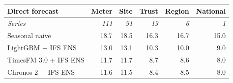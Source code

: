 \begin{tabular}{lrrrrr}
\toprule
Direct forecast & Meter & Site & Trust & Region & National \\
\midrule
\textit{Series} & \textit{111} & \textit{91} & \textit{19} & \textit{6} & \textit{1} \\
\addlinespace[3pt]
Seasonal naive & 18.7 & 18.5 & 16.3 & 16.7 & 15.0 \\
LightGBM + IFS ENS & 13.0 & 13.1 & 10.3 & 10.0 & 9.0 \\
TimesFM 3.0 + IFS ENS & 11.7 & 11.7 & 8.7 & 8.6 & 8.0 \\
Chronos-2 + IFS ENS & 11.6 & 11.5 & 8.4 & 8.5 & 8.0 \\
\bottomrule
\end{tabular}
